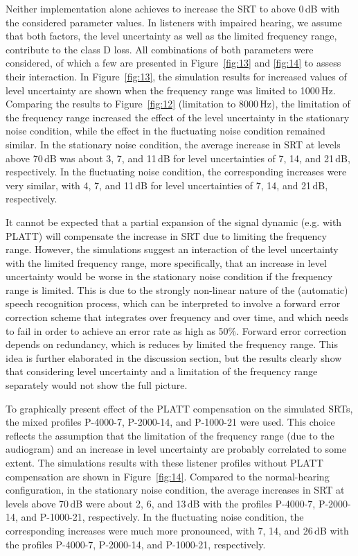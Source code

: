 \documentclass[10pt,a4paper,twocolumn]{article}
\begin{document}
Neither implementation alone achieves to increase the SRT to above 0\,dB with the considered parameter values.
%
In listeners with impaired hearing, we assume that both factors, the level uncertainty as well as the limited frequency range, contribute to the class D loss.
%
All combinations of both parameters were considered, of which a few are presented in Figure~\ref{fig:13} and \ref{fig:14} to assess their interaction.
%
In Figure~\ref{fig:13}, the simulation results for increased values of level uncertainty are shown when the frequency range was limited to 1000\,Hz.
%
Comparing the results to Figure~\ref{fig:12} (limitation to 8000\,Hz), the limitation of the frequency range increased the effect of the level uncertainty in the stationary noise condition, while the effect in the fluctuating noise condition remained similar.
%
In the stationary noise condition, the average increase in SRT at levels above 70\,dB was about 3, 7, and 11\,dB for level uncertainties of 7, 14, and 21\,dB, respectively.
%
In the fluctuating noise condition, the corresponding increases were very similar, with 4, 7, and 11\,dB for level uncertainties of 7, 14, and 21\,dB, respectively.

It cannot be expected that a partial expansion of the signal dynamic (e.g. with PLATT) will compensate the increase in SRT due to limiting the frequency range.
%
However, the simulations suggest an interaction of the level uncertainty with the limited frequency range, more specifically, that an increase in level uncertainty would be worse in the stationary noise condition if the frequency range is limited.
%
This is due to the strongly non-linear nature of the (automatic) speech recognition process, which can be interpreted to involve a forward error correction scheme that integrates over frequency and over time, and which needs to fail in order to achieve an error rate as high as 50\%.
%
Forward error correction depends on redundancy, which is reduces by limited the frequency range.
%
This idea is further elaborated in the discussion section, but the results clearly show that considering level uncertainty and a limitation of the frequency range separately would not show the full picture.

To graphically present effect of the PLATT compensation on the simulated SRTs, the mixed profiles P-4000-7, P-2000-14, and P-1000-21 were used.
%
This choice reflects the assumption that the limitation of the frequency range (due to the audiogram) and an increase in level uncertainty are probably correlated to some extent.
%
The simulations results with these listener profiles without PLATT compensation are shown in Figure~\ref{fig:14}.
%
Compared to the normal-hearing configuration, in the stationary noise condition, the average increases in SRT at levels above 70\,dB were about 2, 6, and 13\,dB with the profiles P-4000-7, P-2000-14, and P-1000-21, respectively.
%
In the fluctuating noise condition, the corresponding increases were much more pronounced, with 7, 14, and 26\,dB with the profiles P-4000-7, P-2000-14, and P-1000-21, respectively.
\end{document}
